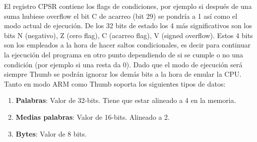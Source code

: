 {    El registro CPSR contiene los flags de condiciones, por ejemplo si después de una suma hubiese overflow el bit C de acarreo (bit 29) se pondría a 1 así como el modo actual de ejecución.
    De los 32 bits de estado los 4 más significativos son los bits N (negativo), Z (cero flag), C (acarreo flag), V (signed overflow). Estos 4 bits son los empleados a la hora de hacer saltos condicionales, es decir para
    continuar la ejecución del programa en otro punto dependiendo de si se cumple o no una condición (por ejemplo si una resta da 0). 
    Dado que el modo de ejecución será siempre Thumb se podrán ignorar los demás bits a la hora de emular la CPU. \\

    Tanto en modo ARM como Thumb soporta los siguientes tipos de datos:
    \begin{enumerate}
        \item \textbf{Palabras}: Valor de 32-bits. Tiene que estar alineado a 4 en la memoria.
        \item \textbf{Medias palabras}: Valor de 16-bits. Alineado a 2.
        \item \textbf{Bytes}: Valor de 8 bits.
    \end{enumerate}
}

